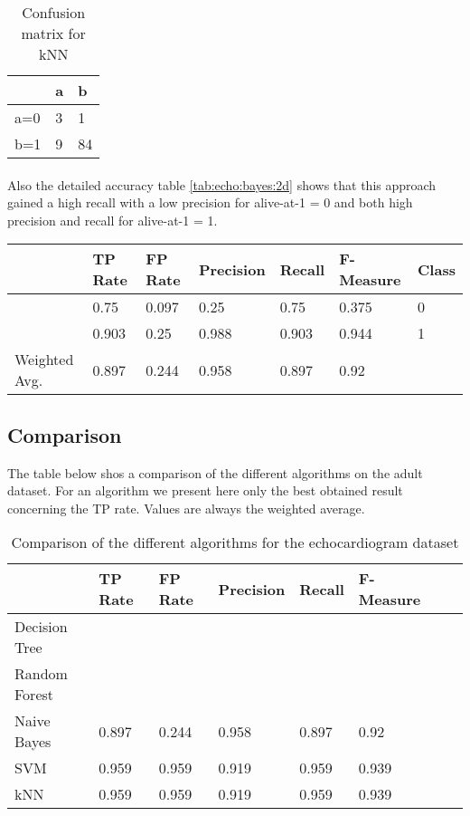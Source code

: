 \documentclass[paper=a4, fontsize=11pt]{scrartcl} %
\numberwithin{equation}{section} %
\numberwithin{figure}{section} %
\numberwithin{table}{section} %
\begin{document}
\begin{table}[h]
\centering
\begin{tabular}{|l|ll|}
\hline
 & a &	b \\
\hline
a=0 & 3 & 1 \\
b=1 & 9 & 84\\
\hline
\end{tabular}
\caption{Confusion matrix for kNN}
\label{tab:echo:bayes:2c}
\end{table}

\paragraph{}Also the detailed accuracy table \ref{tab:echo:bayes:2d} shows that this approach gained a high recall with a low precision for alive-at-1 = 0 and both high precision and recall for alive-at-1 = 1.

\begin{table*}[htb]\centering
  \begin{tabular*}{\columnwidth}{@{}lllllll@{}}
      \toprule 
              &  TP Rate & FP Rate & Precision & Recall & F-Measure & Class    \\  \midrule
              &   0.75   & 0.097   & 0.25      & 0.75   & 0.375     & 0 \\
              &   0.903  & 0.25    & 0.988     & 0.903  & 0.944     & 1 \\
Weighted Avg. &   0.897  & 0.244   & 0.958     & 0.897  & 0.92      &   \\ \bottomrule
  \end{tabular*}
\caption{Naive Bayes with SMOTE filter} 
\label{tab:echo:bayes:2d}
\end{table*}


\subsection{Comparison}

The table below shos a comparison of the different algorithms on the adult dataset. For an algorithm we present here only the best obtained result concerning the TP rate. Values are always the weighted average.

\begin{table}[h]
\centering
\begin{tabular}{llllllll}
	\toprule
									&TP Rate   	&FP Rate   &Precision &Recall  &F-Measure \\
	\midrule
	Decision Tree		\\
  Random Forest		\\
  Naive Bayes			&   0.897  & 0.244   & 0.958     & 0.897  & 0.92     \\
  SVM							&0.959     	&0.959     	&0.919   	&0.959   &0.939    \\
  kNN							&0.959     	&0.959     	&0.919   	&0.959   &0.939    \\
	\bottomrule
\end{tabular}
\caption{Comparison of the different algorithms for the echocardiogram dataset}
\end{table}
\end{document}
